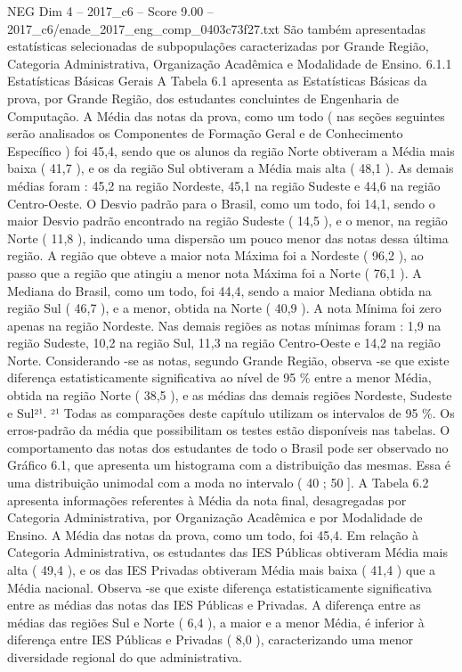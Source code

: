 \begin{textsample}{NEG Dim 4 – 2017\_c6 – Score 9.00 – 2017\_c6/enade\_2017\_eng\_comp\_0403c73f27.txt}
São também apresentadas estatísticas selecionadas de subpopulações caracterizadas por Grande Região, Categoria Administrativa, Organização Acadêmica e Modalidade de Ensino. 6.1.1 Estatísticas Básicas Gerais A Tabela 6.1 apresenta as Estatísticas Básicas da prova, por Grande Região, dos estudantes concluintes de Engenharia de Computação.
A Média das notas da prova, como um todo ( nas seções seguintes serão analisados os Componentes de Formação Geral e de Conhecimento Específico ) foi 45,4, sendo que os alunos da região Norte obtiveram a Média mais baixa ( 41,7 ), e os da região Sul obtiveram a Média mais alta ( 48,1 ).
As demais médias foram : 45,2 na região Nordeste, 45,1 na região Sudeste e 44,6 na região Centro-Oeste.
O Desvio padrão para o Brasil, como um todo, foi 14,1, sendo o maior Desvio padrão encontrado na região Sudeste ( 14,5 ), e o menor, na região Norte ( 11,8 ), indicando uma dispersão um pouco menor das notas dessa última região.
A região que obteve a maior nota Máxima foi a Nordeste ( 96,2 ), ao passo que a região que atingiu a menor nota Máxima foi a Norte ( 76,1 ).
A Mediana do Brasil, como um todo, foi 44,4, sendo a maior Mediana obtida na região Sul ( 46,7 ), e a menor, obtida na Norte ( 40,9 ).
A nota Mínima foi zero apenas na região Nordeste.
Nas demais regiões as notas mínimas foram : 1,9 na região Sudeste, 10,2 na região Sul, 11,3 na região Centro-Oeste e 14,2 na região Norte.
Considerando -se as notas, segundo Grande Região, observa -se que existe diferença estatisticamente significativa ao nível de 95 \% entre a menor Média, obtida na região Norte ( 38,5 ), e as médias das demais regiões Nordeste, Sudeste e Sul²¹. ²¹ Todas as comparações deste capítulo utilizam os intervalos de 95 \%.
Os erros-padrão da média que possibilitam os testes estão disponíveis nas tabelas.
O comportamento das notas dos estudantes de todo o Brasil pode ser observado no Gráfico 6.1, que apresenta um histograma com a distribuição das mesmas.
Essa é uma distribuição unimodal com a moda no intervalo ( 40 ; 50 ].
A Tabela 6.2 apresenta informações referentes à Média da nota final, desagregadas por Categoria Administrativa, por Organização Acadêmica e por Modalidade de Ensino.
A Média das notas da prova, como um todo, foi 45,4.
Em relação à Categoria Administrativa, os estudantes das IES Públicas obtiveram Média mais alta ( 49,4 ), e os das IES Privadas obtiveram Média mais baixa ( 41,4 ) que a Média nacional.
Observa -se que existe diferença estatisticamente significativa entre as médias das notas das IES Públicas e Privadas.
A diferença entre as médias das regiões Sul e Norte ( 6,4 ), a maior e a menor Média, é inferior à diferença entre IES Públicas e Privadas ( 8,0 ), caracterizando uma menor diversidade regional do que administrativa.

\end{textsample}
